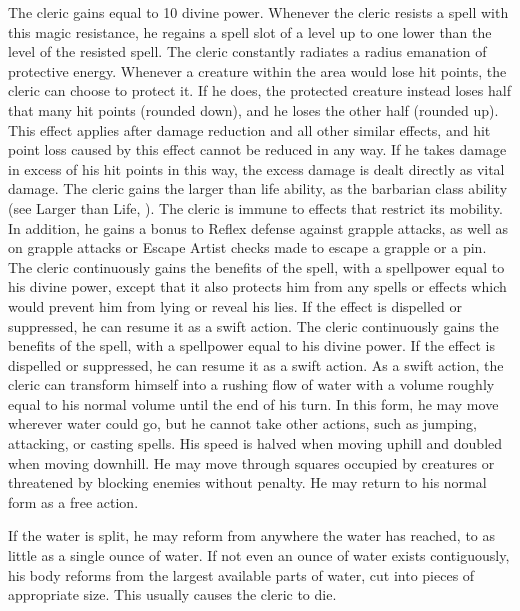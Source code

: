             The cleric gains  equal to 10 \add divine power.
            Whenever the cleric resists a spell with this magic resistance, he regains a spell slot of a level up to one lower than the level of the resisted spell.
            The cleric constantly radiates a \areamed radius emanation of protective energy.
            Whenever a creature within the area would lose hit points, the cleric can choose to protect it.
            If he does, the protected creature instead loses half that many hit points (rounded down), and he loses the other half (rounded up).
            This effect applies after damage reduction and all other similar effects, and hit point loss caused by this effect cannot be reduced in any way.
            If he takes damage in excess of his hit points in this way, the excess damage is dealt directly as vital damage.
            The cleric gains the larger than life ability, as the barbarian class ability (see Larger than Life, ).
            The cleric is immune to effects that restrict its mobility. In addition, he gains a  bonus to Reflex defense against grapple attacks, as well as on grapple attacks or Escape Artist checks made to escape a grapple or a pin.
             The cleric continuously gains the benefits of the 
            spell, with a spellpower equal to his divine power, except that it also protects him from any spells or effects which would prevent him from lying or reveal his lies.
            If the effect is dispelled or suppressed, he can resume it as a swift action.
             The cleric continuously gains the benefits of the 
            spell, with a spellpower equal to his divine power.
            If the effect is dispelled or suppressed, he can resume it as a swift action.
            As a swift action, the cleric can transform himself into a rushing flow of water with a volume roughly equal to his normal volume until the end of his turn.
            In this form, he may move wherever water could go, but he cannot take other actions, such as jumping, attacking, or casting spells.
            His speed is halved when moving uphill and doubled when moving downhill.
            He may move through squares occupied by creatures or threatened by blocking enemies without penalty.
            He may return to his normal form as a free action.
            \par If the water is split, he may reform from anywhere the water has reached, to as little as a single ounce of water.
            If not even an ounce of water exists contiguously, his body reforms from the largest available parts of water, cut into pieces of appropriate size.
            This usually causes the cleric to die.

